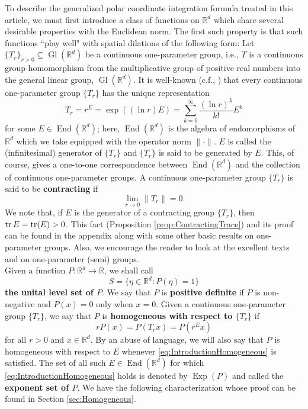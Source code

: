 \documentclass[11pt]{article}
\theoremstyle{remark}
\newcommand\End{\operatorname{End}} %
\newcommand\Gl{\operatorname{Gl}} %
\newcommand\Exp{\operatorname{Exp}}
\begin{document}
\noindent To describe the generalized polar coordinate integration formula treated in this article, we must first introduce a class of functions on $\mathbb{R}^d$ which share several desirable properties with the Euclidean norm. The first such property is that such functions ``play well" with spatial dilations of the following form: Let $\{T_r\}_{r>0}\subseteq \Gl(\mathbb{R}^d)$ be a continuous one-parameter group, i.e., $T$ is a continuous group homomorphism from the multiplicative group of positive real numbers into the general linear group, $\Gl(\mathbb{R}^d)$. It is well-known (c.f., \cite{randles_convolution_2017,engel_one-parameter_2000,engel_short_2006}) that every continuous one-parameter group $\{T_r\}$ has the unique representation
\begin{equation*}
T_r=r^E=\exp((\ln r) E)=\sum_{k=0}^\infty \frac{(\ln r)^k}{k!}E^k
\end{equation*}
for some $E\in\End(\mathbb{R}^d)$; here,  $\End(\mathbb{R}^d)$ is the algebra of endomorphisms of $\mathbb{R}^d$ which we take equipped with the operator norm $\|\cdot\|$. $E$ is called the (infinitesimal) generator of $\{T_r\}$ and $\{T_r\}$ is said to be generated by $E$. This, of course, gives a one-to-one correspondence between $\End(\mathbb{R}^d)$ and the collection of continuous one-parameter groups.  A continuous one-parameter group $\{T_r\}$ is said to be \textbf{contracting} if
\begin{equation*}
\lim_{r\to 0}\|T_r\|=0. 
\end{equation*}
We note that, if $E$ is the generator of a contracting group $\{T_r\}$, then $\tr E=\tr(E)>0$. This fact (Proposition \ref{prop:ContractingTrace}) and its proof can be found in the appendix along with some other basic results on one-parameter groups. Also, we encourage the reader to look at the excellent texts \cite{engel_one-parameter_2000} and \cite{engel_short_2006} on one-parameter (semi) groups.\\

\noindent Given a function $P:\mathbb{R}^d\to\mathbb{R}$, we shall call
\begin{equation*}
    S=\{\eta\in\mathbb{R}^d:P(\eta)=1\}
\end{equation*}
\textbf{the unital level set of $P$}. We say that $P$ is \textbf{positive definite} if $P$ is non-negative and $P(x)=0$ only when $x=0$. Given a continuous one-parameter group $\{T_r\}$, we say that $P$ is \textbf{homogeneous with respect to $\{T_r\}$} if
\begin{equation}\label{eq:IntroductionHomogeneous}
    rP(x)=P(T_r x)=P(r^Ex)
\end{equation}
for all $r>0$ and $x\in\mathbb{R}^d$. By an abuse of language, we will also say that $P$ is homogeneous with respect to $E$ whenever \eqref{eq:IntroductionHomogeneous} is satisfied. The set of all such $E\in \End(\mathbb{R}^d)$ for which \eqref{eq:IntroductionHomogeneous} holds is denoted by $\Exp(P)$ and called the \textbf{exponent set of $P$}. We have the following characterization whose proof can be found in Section \ref{sec:Homogeneous}.
\end{document}
